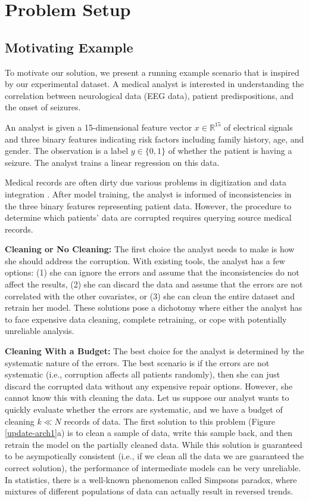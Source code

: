 \section{Problem Setup}
\subsection{Motivating Example}
To motivate our solution, we present a running example scenario that is inspired by our experimental dataset.
A medical analyst is interested in understanding the correlation between neurological data (EEG data), patient predispositions, and the onset of seizures.

\begin{example}
An analyst is given a 15-dimensional feature vector $x \in \mathbb{R}^{15}$ of electrical signals and three binary features indicating risk factors including family history, age, and gender.
The observation is a label $y\in \{0,1\}$ of whether the patient is having a seizure.
The analyst trains a linear regression on this data.

Medical records are often dirty due various problems in digitization and data integration \cite{fortunearticle}.
After model training, the analyst is informed of inconsistencies in the three binary features representing patient data.
However, the procedure to determine which patients' data are corrupted requires querying source medical records.
\end{example}

\noindent\textbf{Cleaning or No Cleaning: } The first choice the analyst needs to make is how she should address the corruption. With existing tools, the analyst has a few options: (1) she can ignore the errors and assume that the inconsistencies do not affect the results, (2) she can discard the data and assume that the errors are not correlated with the other covariates, or (3) she can clean the entire dataset and retrain her model.
These solutions pose a dichotomy where either the analyst has to face expensive data cleaning, complete retraining, or cope with potentially unreliable analysis.

\vspace{0.5em}

\noindent\textbf{Cleaning With a Budget: } The best choice for the analyst is determined by the systematic nature of the errors. The best scenario is if the errors are not systematic (i.e., corruption affects all patients randomly), then she can just discard the corrupted data without any expensive repair options. 
However, she cannot know this with cleaning the data.
Let us suppose our analyst wants to quickly evaluate whether the errors are systematic, and we have a budget of cleaning $k \ll N$ records of data.
The first solution to this problem (Figure \ref{update-arch1}a) is to clean a sample of data, write this sample back, and then retrain the model on the partially cleaned data.
While this solution is guaranteed to be asympotically consistent (i.e., if we clean all the data we are guaranteed the correct solution), the performance of intermediate models can be very unreliable.
In statistics, there is a well-known phenomenon called Simpsons paradox, where mixtures of different populations of data can actually result in reversed trends.

